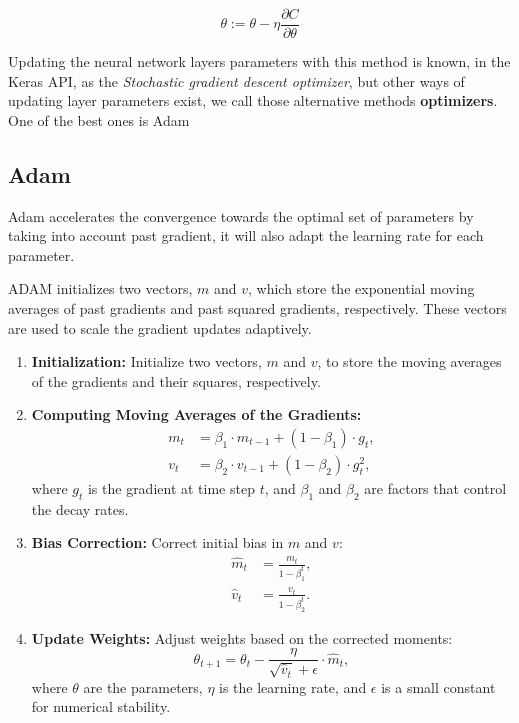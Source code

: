 \documentclass[a4paper, twocolumn, twoside]{article}
\begin{document}
	$$
	\theta := \theta - \eta \frac{\partial C}{\partial \theta}
	$$

        Updating the neural network layers parameters with this method is known, in the Keras API, as the \textit{Stochastic gradient descent optimizer},
	but other ways of updating layer parameters exist, we call those alternative methods \textbf{optimizers}. One of the best ones is Adam \cite{kingma2017adam}

	\subsection{Adam}
	Adam accelerates the convergence towards the optimal set of parameters by taking into account past gradient,
	it will also adapt the learning rate for each parameter.

	ADAM initializes two vectors, 
	$m$ and $v$, which store the exponential moving averages of past gradients and past squared gradients,
	respectively. These vectors are used to scale the gradient updates adaptively.

	\begin{enumerate}
	  \item \textbf{Initialization:} Initialize two vectors, $m$ and $v$, to store the moving averages of the gradients and their squares, respectively.
	  \item \textbf{Computing Moving Averages of the Gradients:}
		\begin{align*}
		  m_t &= \beta_1 \cdot m_{t-1} + (1 - \beta_1) \cdot g_t, \\
		  v_t &= \beta_2 \cdot v_{t-1} + (1 - \beta_2) \cdot g_t^2,
		\end{align*}
		where $g_t$ is the gradient at time step $t$, and $\beta_1$ and $\beta_2$ are factors that control the decay rates.
	  \item \textbf{Bias Correction:} Correct initial bias in $m$ and $v$:
		\begin{align*}
		  \hat{m}_t &= \frac{m_t}{1 - \beta_1^t}, \\
		  \hat{v}_t &= \frac{v_t}{1 - \beta_2^t}.
		\end{align*}
	  \item \textbf{Update Weights:} Adjust weights based on the corrected moments:
		\begin{equation*}
		  \theta_{t+1} = \theta_t - \frac{\eta}{\sqrt{\hat{v}_t} + \epsilon} \cdot \hat{m}_t,
		\end{equation*}
		where $\theta$ are the parameters, $\eta$ is the learning rate, and $\epsilon$ is a small constant for numerical stability.
	\end{enumerate}
\end{document}
